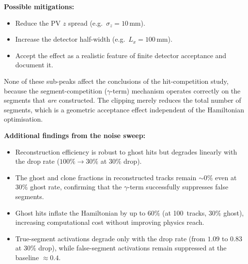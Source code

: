\documentclass[11pt,a4paper]{article}
\newcommand{\halfx}{L_x}
\begin{document}
\noindent\textbf{Possible mitigations:}
\begin{itemize}
  \item Reduce the PV $z$ spread (e.g.\ $\sigma_z = 10$\,mm).
  \item Increase the detector half-width (e.g.\ $\halfx = 100$\,mm).
  \item Accept the effect as a realistic feature of finite detector
        acceptance and document it.
\end{itemize}

None of these sub-peaks affect the conclusions of the hit-competition
study, because the segment-competition ($\gamma$-term) mechanism operates
correctly on the segments that \emph{are} constructed.  The clipping merely
reduces the total number of segments, which is a geometric acceptance
effect independent of the Hamiltonian optimisation.

\noindent\textbf{Additional findings from the noise sweep:}
\begin{itemize}
  \item Reconstruction efficiency is robust to ghost hits but degrades
        linearly with the drop rate ($100\% \to 30\%$ at $30\%$ drop).
  \item The ghost and clone fractions in reconstructed tracks remain
        ${\sim}0\%$ even at $30\%$ ghost rate, confirming that the
        $\gamma$-term successfully suppresses false segments.
  \item Ghost hits inflate the Hamiltonian by up to $60\%$ (at 100~tracks,
        $30\%$ ghost), increasing computational cost without improving
        physics reach.
  \item True-segment activations degrade only with the drop rate (from
        $1.09$ to $0.83$ at $30\%$ drop), while false-segment activations
        remain suppressed at the baseline $\approx 0.4$.
\end{itemize}
\end{document}
